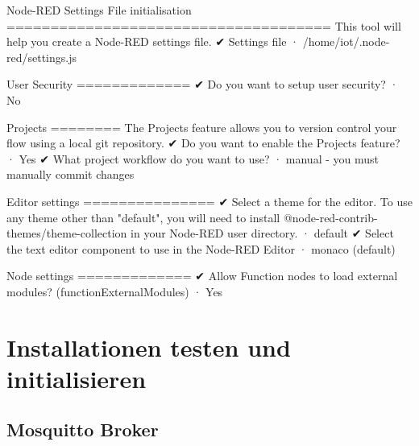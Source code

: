 \documentclass[
  11pt,
  a4paper,
  oneside, openany  ,captions=tableheading
]{scrbook}
\newenvironment{Shaded}{\begin{snugshade}}{\end{snugshade}}
\newcommand{\AttributeTok}[1]{\textcolor[rgb]{0.40,0.45,0.13}{#1}}
\newcommand{\ErrorTok}[1]{\textcolor[rgb]{0.68,0.00,0.00}{#1}}
\newcommand{\ExtensionTok}[1]{\textcolor[rgb]{0.00,0.23,0.31}{#1}}
\newcommand{\KeywordTok}[1]{\textcolor[rgb]{0.00,0.23,0.31}{#1}}
\newcommand{\NormalTok}[1]{\textcolor[rgb]{0.00,0.23,0.31}{#1}}
\newcommand{\PreprocessorTok}[1]{\textcolor[rgb]{0.68,0.00,0.00}{#1}}
\newcommand{\StringTok}[1]{\textcolor[rgb]{0.13,0.47,0.30}{#1}}
\theoremstyle{remark}
\begin{document}
\begin{Shaded}
\begin{Highlighting}[]
\ExtensionTok{Node{-}RED}\NormalTok{ Settings File initialisation}
\ExtensionTok{=====================================}
\ExtensionTok{This}\NormalTok{ tool will help you create a Node{-}RED settings file.}
\ExtensionTok{✔}\NormalTok{ Settings file · /home/iot/.node{-}red/settings.js}

\ExtensionTok{User}\NormalTok{ Security}
\ExtensionTok{=============}
\ExtensionTok{✔}\NormalTok{ Do you want to setup user security}\PreprocessorTok{?}\NormalTok{ · No}

\ExtensionTok{Projects}
\ExtensionTok{========}
\ExtensionTok{The}\NormalTok{ Projects feature allows you to version control your flow using a local git repository.}
\ExtensionTok{✔}\NormalTok{ Do you want to enable the Projects feature}\PreprocessorTok{?}\NormalTok{ · Yes}
\ExtensionTok{✔}\NormalTok{ What project workflow do you want to use}\PreprocessorTok{?}\NormalTok{ · manual }\AttributeTok{{-}}\NormalTok{ you must manually commit changes}

\ExtensionTok{Editor}\NormalTok{ settings}
\ExtensionTok{===============}
\ExtensionTok{✔}\NormalTok{ Select a theme for the editor. To use any theme other than }\StringTok{"default"}\NormalTok{, you will need to install @node{-}red{-}contrib{-}themes/theme{-}collection in your Node{-}RED user directory. · default}
\ExtensionTok{✔}\NormalTok{ Select the text editor component to use in the Node{-}RED Editor · monaco }\ErrorTok{(}\ExtensionTok{default}\KeywordTok{)}

\ExtensionTok{Node}\NormalTok{ settings}
\ExtensionTok{=============}
\ExtensionTok{✔}\NormalTok{ Allow Function nodes to load external modules}\PreprocessorTok{?} \ErrorTok{(}\ExtensionTok{functionExternalModules}\KeywordTok{)} \ExtensionTok{·}\NormalTok{ Yes}
\end{Highlighting}
\end{Shaded}

\section{Installationen testen und
initialisieren}\label{installationen-testen-und-initialisieren}

\subsection{Mosquitto Broker}\label{mosquitto-broker}
\end{document}
